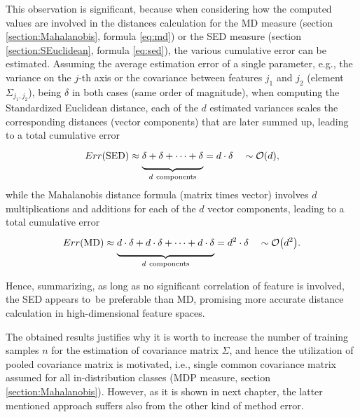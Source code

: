 This observation is significant, because when considering how the computed values are involved in the distances calculation for the MD measure (section \ref{section:Mahalanobis}, formula \ref{eq:md}) or the SED measure (section \ref{section:SEuclidean}, formula \ref{eq:sed}), the various cumulative error can be estimated. Assuming the average estimation error of a single parameter, e.g., the variance on the $j$-th axis or the covariance between features $j_1$ and $j_2$ (element $\Sigma_{j_1,j_2}$), being $\delta$ in both cases (same order of magnitude), when computing the Standardized Euclidean distance, each of the $d$ estimated variances scales the corresponding distances (vector components) that are later summed up, leading to a total cumulative error
\begin{equation}
    Err( \text{SED} )
    \approx
    \underbrace{
        \vphantom{\frac{a}{b}}  %
        \delta + \delta + \dots + \delta
    }_{d~\text{components}}
    = d \cdot \delta
    \quad
    \sim
    \order{ d },
    \label{eq:sed-error}
\end{equation}
while the Mahalanobis distance formula (matrix times vector) involves $d$ multiplications and additions for each of the $d$ vector components, leading to a total cumulative error
\begin{equation}
    Err( \text{MD} )
    \approx
    \underbrace{
        \vphantom{\frac{a}{b}}  %
        d \cdot \delta + d \cdot \delta + \dots + d \cdot \delta
    }_{d~\text{components}}
    = d^2 \cdot \delta
    \quad
    \sim
    \order{ d^2 }.
    \label{eq:md-error}
\end{equation}

Hence, summarizing, as long as no significant correlation of feature is involved, the SED appears to~be preferable than MD, promising more accurate distance calculation in high-dimensional feature spaces.

The obtained results justifies why it is worth to increase the number of training samples $n$ for the estimation of covariance matrix $\Sigma$, and hence the utilization of pooled covariance matrix is motivated, i.e., single common covariance matrix assumed for all in-distribution classes (MDP measure, section \ref{section:Mahalanobis}). However, as it is shown in next chapter, the latter mentioned approach suffers also from the other kind of method error.

